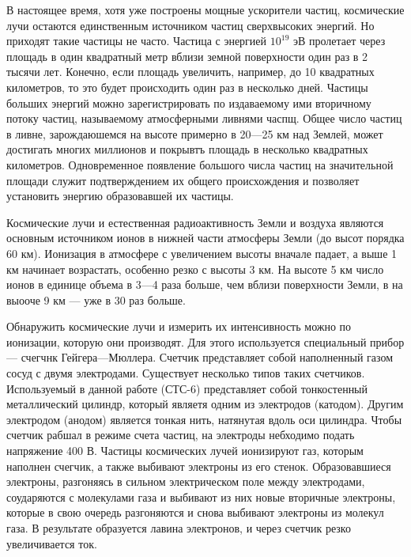 \documentclass[14pt]{article}
\begin{document}
\vspace{0.5cm}
В настоящее время, хотя уже построены мощные ускорители частиц, космические лучи остаются единственным источником частиц сверхвысоких энергий. Но приходят такие частицы не часто. Частица с энергией $10^{19}$ эВ пролетает через площадь в один квадратный метр вблизи земной поверхности один раз в 2 тысячи лет. Конечно, если площадь увеличить, например, до 10 квадратных километров, то это будет происходить один раз в несколько дней. Частицы больших энергий можно зарегистрировать по издаваемому ими вторичному потоку частиц, называемому атмосферными ливнями часпщ. Общее число частиц в ливне, зарождаюшемся на высоте примерно в 20—25 км над Землей, может достигать многих миллионов и покрывтъ площадь в несколько квадратных километров. Одновременное появление большого числа частиц на значительной площади служит подтверждением их общего происхождения и позволяет установить энергию образовавшей их частицы.

Космические лучи и естественная радиоактивность Земли и воздуха являются основным источником ионов в нижней части атмосферы Земли (до высот порядка 60 км). Ионизация в атмосфере с увеличением высоты вначале падает, а выше 1 км начинает возрастать, особенно резко с высоты 3 км. На высоте 5 км число ионов в единице объема в 3—4 раза больше, чем вблизи поверхности Земли, в на выооче 9 км --- уже в 30 раз больше.

\vspace{0.5cm}
Обнаружить космические лучи и измерить их интенсивность можно по ионизации, которую они производят. Для этого используется специальный прибор — счегчнк Гейгера—Мюллера. Счетчик представляет собой наполненный газом сосуд с двумя электродами. Существует несколько типов таких счетчиков. Используемый в данной работе (СТС-6) представляет собой тонкостенный металлический цилиндр, который являетя одним из электродов (катодом). Другим электродом (анодом) является тонкая нить, натянутая вдоль оси цилиндра. Чтобы счетчик рабшал в режиме счета частиц, на электроды небходимо подать напряжение 400 В. Частицы космических лучей ионизируют газ, которым наполнен счегчик, а также выбивают электроны из его стенок. Образовавшиеся электроны, разгоняясь в сильном электрическом поле между электродами, соударяются с молекулами газа и выбивают из них новые вторичные электроны, которые в свою очередь разгоняются и снова выбивают электроны из молекул газа. В результате образуется лавина электронов, и через счетчик резко увеличивается ток. 
\end{document}
